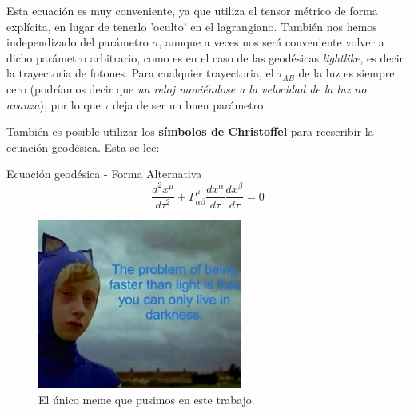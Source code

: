 Esta ecuación es muy conveniente, ya que utiliza el tensor métrico de forma explícita, en lugar de tenerlo 'oculto' en el lagrangiano. También nos hemos independizado del parámetro $\sigma$, aunque a veces nos será conveniente volver a dicho parámetro arbitrario, como es en el caso de las geodésicas \textit{lightlike}, es decir la trayectoria de fotones. Para cualquier trayectoria, el $\tau_{AB}$ de la luz es siempre cero (podríamos decir que \textit{un reloj moviéndose a la velocidad de la luz no avanza}), por lo que $\tau$ deja de ser un buen parámetro.

También es posible utilizar los \textbf{símbolos de Christoffel} para reescribir la ecuación geodésica. Esta se lee:

\begin{remarkbox}{Ecuación geodésica - Forma Alternativa}
\begin{equation}
\frac{d^2x^{\mu}}{d\tau^2}+\Gamma^{\mu}_{\alpha\beta}\frac{dx^{\alpha}}{d\tau}\frac{dx^{\beta}}{d\tau}=0
\label{geodesicx}
\end{equation}
\end{remarkbox}

\begin{figure}
    \centering
    \includegraphics[width=0.6\textwidth]{Im/sonic.jpg}
    \caption{El único meme que pusimos en este trabajo.}
    \label{fig:my_label}
\end{figure}






